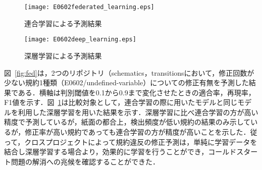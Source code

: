 \documentclass[uplatex,dvipdfmx,a4paper,twocolumn,base=11pt,jbase=11pt,ja=standard]{bxjsarticle}  %
\begin{document}
\begin{figure}
\begin{center}
\texttt{[image: E0602federated\_learning.eps]}
\vspace{-3mm}
\caption{連合学習による予測結果}
\label{fig:fed}
\end{center}

\vspace{-8mm}

\begin{center}
\texttt{[image: E0602deep\_learning.eps]}
\vspace{-3mm}
\caption{深層学習による予測結果}
\label{fig:deep}
\end{center}
\vspace{-12mm}
\end{figure}






図~\ref{fig:fed}は，2つのリポジトリ（schematics，transitionsにおいて，修正回数が少ない規約1種類（E0602/undefined-variable）についての修正有無を予測した結果である．横軸は判別閾値を0.1から0.9まで変化させたときの適合率，再現率，F1値を示す．図~\ref{fig:deep}は比較対象として，連合学習の際に用いたモデルと同じモデルを利用した深層学習を用いた結果を示す．深層学習に比べ連合学習の方が高い精度で予測しているが，紙面の都合上，検出頻度が低い規約の結果のみ示しているが，修正率が高い規約であっても連合学習の方が精度が高いことを示した．従って，クロスプロジェクトによって規約違反の修正予測は，単純に学習データを結合し深層学習する場合より，効果的に学習を行うことができ，コールドスタート問題の解消への兆候を確認することができた．
\end{document}
